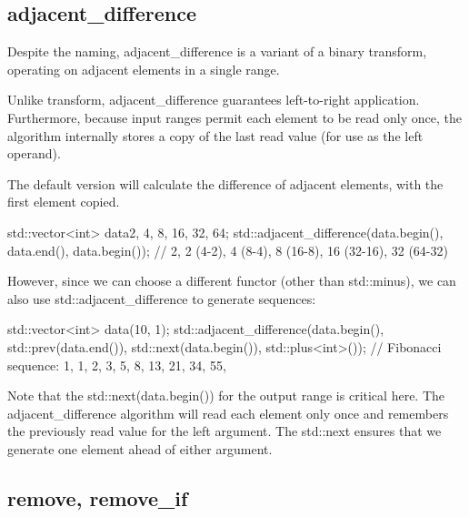 \subsection{adjacent\_difference}

Despite the naming, adjacent\_difference is a variant of a binary transform, operating on adjacent elements in a single range.

Unlike transform, adjacent\_difference guarantees left-to-right application. Furthermore, because input ranges permit each element to be read only once, the algorithm internally stores a copy of the last read value (for use as the left operand).



The default version will calculate the difference of adjacent elements, with the first element copied.

\begin{box-note}
\begin{cppcode}
std::vector<int> data{2, 4, 8, 16, 32, 64};
std::adjacent_difference(data.begin(), data.end(), data.begin());
// 2, 2 (4-2), 4 (8-4), 8 (16-8), 16 (32-16), 32 (64-32)
\end{cppcode}
\end{box-note}

However, since we can choose a different functor (other than std::minus), we can also use std::adjacent\_difference to generate sequences:

\begin{box-note}
\begin{cppcode}
std::vector<int> data(10, 1);
std::adjacent_difference(data.begin(), std::prev(data.end()), 
                         std::next(data.begin()), std::plus<int>());
// Fibonacci sequence: 1, 1, 2, 3, 5, 8, 13, 21, 34, 55,
\end{cppcode}
\end{box-note}

Note that the std::next(data.begin()) for the output range is critical here. The adjacent\_difference algorithm will read each element only once and remembers the previously read value for the left argument. The std::next ensures that we generate one element ahead of either argument.

\subsection{remove, remove\_if}

